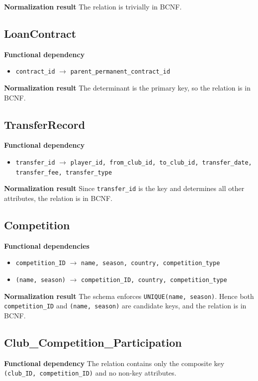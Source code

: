 \documentclass[12pt,a4paper]{article}
\begin{document}
\textbf{Normalization result} The relation is trivially in BCNF.

\subsection{LoanContract}
\textbf{Functional dependency}
\begin{itemize}
    \item \texttt{contract\_id} $\rightarrow$ \texttt{parent\_permanent\_contract\_id}
\end{itemize}
\textbf{Normalization result} The determinant is the primary key, so the relation is in BCNF.

\subsection{TransferRecord}
\textbf{Functional dependency}
\begin{itemize}
    \item \texttt{transfer\_id} $\rightarrow$ \texttt{player\_id, from\_club\_id, to\_club\_id, transfer\_date, transfer\_fee, transfer\_type}
\end{itemize}
\textbf{Normalization result} Since \texttt{transfer\_id} is the key and determines all other attributes, the relation is in BCNF.

\subsection{Competition}
\textbf{Functional dependencies}
\begin{itemize}
    \item \texttt{competition\_ID} $\rightarrow$ \texttt{name, season, country, competition\_type}
    \item \texttt{(name, season)} $\rightarrow$ \texttt{competition\_ID, country, competition\_type}
\end{itemize}
\textbf{Normalization result} The schema enforces \texttt{UNIQUE(name, season)}. Hence both \texttt{competition\_ID} and \texttt{(name, season)} are candidate keys, and the relation is in BCNF.

\subsection{Club\_Competition\_Participation}
\textbf{Functional dependency} The relation contains only the composite key \texttt{(club\_ID, competition\_ID)} and no non-key attributes.
\end{document}
